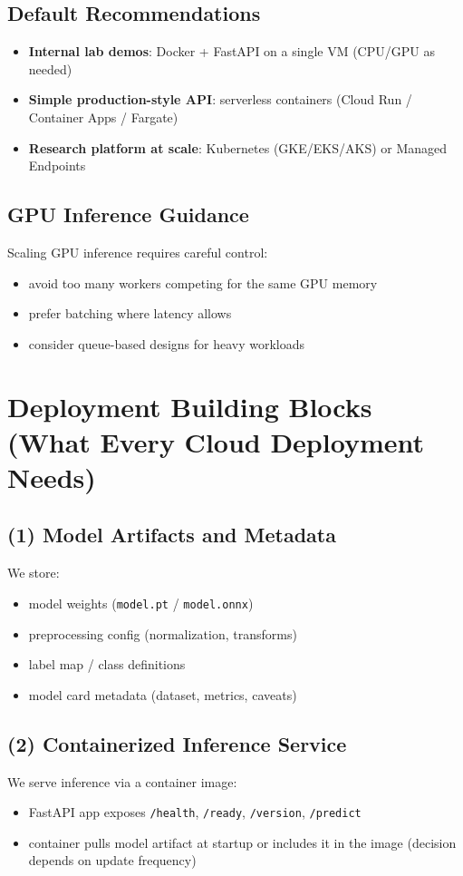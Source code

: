\documentclass[11pt]{article}
\begin{document}
\subsection{Default Recommendations}
\begin{itemize}
  \item \textbf{Internal lab demos}: Docker + FastAPI on a single VM (CPU/GPU as needed)
  \item \textbf{Simple production-style API}: serverless containers (Cloud Run / Container Apps / Fargate)
  \item \textbf{Research platform at scale}: Kubernetes (GKE/EKS/AKS) or Managed Endpoints
\end{itemize}

\subsection{GPU Inference Guidance}
Scaling GPU inference requires careful control:
\begin{itemize}
  \item avoid too many workers competing for the same GPU memory
  \item prefer batching where latency allows
  \item consider queue-based designs for heavy workloads
\end{itemize}

\section{Deployment Building Blocks (What Every Cloud Deployment Needs)}
\subsection{(1) Model Artifacts and Metadata}
We store:
\begin{itemize}
  \item model weights (\texttt{model.pt} / \texttt{model.onnx})
  \item preprocessing config (normalization, transforms)
  \item label map / class definitions
  \item model card metadata (dataset, metrics, caveats)
\end{itemize}

\subsection{(2) Containerized Inference Service}
We serve inference via a container image:
\begin{itemize}
  \item FastAPI app exposes \texttt{/health}, \texttt{/ready}, \texttt{/version}, \texttt{/predict}
  \item container pulls model artifact at startup or includes it in the image (decision depends on update frequency)
\end{itemize}
\end{document}
